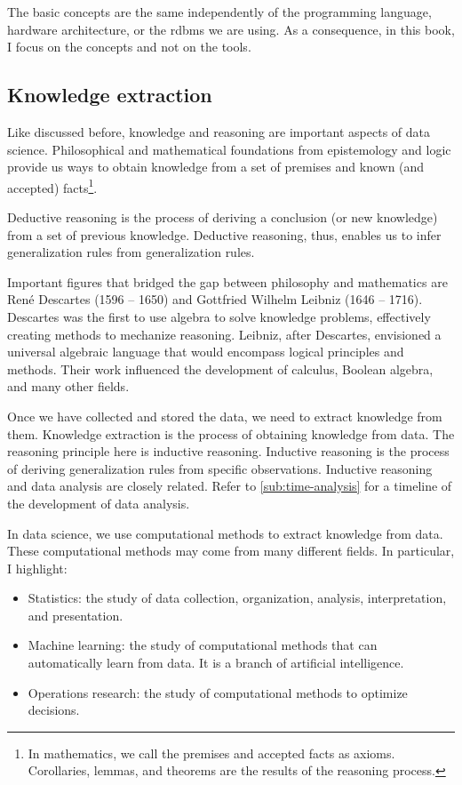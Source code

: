 The basic concepts are the same independently of the programming language, hardware
architecture, or the \gls{rdbms} we are using.  As a consequence, in this book, I focus on
the concepts and not on the tools.

\subsection{Knowledge extraction}
\label{sub:knowledge}

Like discussed before, knowledge and reasoning are important aspects of data science.
Philosophical and mathematical foundations from epistemology and logic provide us ways
to obtain knowledge from a set of premises and known (and accepted) facts\footnote{In
mathematics, we call the premises and accepted facts as axioms.  Corollaries,
lemmas, and theorems are the results of the reasoning process.}.

Deductive reasoning is the process of deriving a conclusion (or new knowledge) from
a set of previous knowledge.  Deductive reasoning, thus, enables us to infer
generalization rules from generalization rules.

Important figures that bridged the gap between philosophy and mathematics are
René Descartes (1596 -- 1650) and Gottfried Wilhelm Leibniz (1646 -- 1716).  Descartes
was the first to use algebra to solve knowledge problems, effectively creating
methods to mechanize reasoning.  Leibniz, after Descartes, envisioned a universal
algebraic language that would encompass logical principles and methods. Their work
influenced the development of calculus, Boolean algebra, and many other fields.

Once we have collected and stored the data, we need to extract knowledge from them.
Knowledge extraction is the process of obtaining knowledge from data.  The reasoning
principle here is inductive reasoning.  Inductive reasoning is the process of deriving
generalization rules from specific observations.  Inductive reasoning and data analysis
are closely related.  Refer to \cref{sub:time-analysis} for a timeline of the development
of data analysis.

In data science, we use computational methods to extract knowledge from data.  These
computational methods may come from many different fields.  In particular, I highlight:
\begin{itemize}
  \itemsep0em
  \item Statistics: the study of data collection, organization, analysis, interpretation,
    and presentation.
  \item Machine learning: the study of computational methods that can automatically learn from data.
    It is a branch of artificial intelligence.
  \item Operations research: the study of computational methods to optimize decisions.
\end{itemize}


